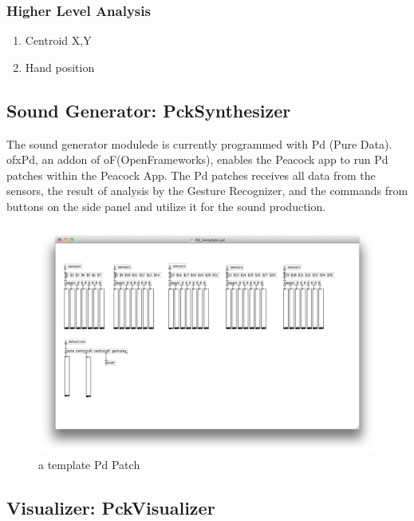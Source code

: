 \documentclass{nime-alternate}
\begin{document}
\subsubsection{Higher Level Analysis}

\begin{enumerate}
       \item Centroid X,Y
       \item Hand position
\end{enumerate}

\subsection{Sound Generator: PckSynthesizer}

The sound generator modulede is currently programmed with Pd (Pure Data)\cite{Pd}. ofxPd\cite{ofxPd}, an addon of oF(OpenFrameworks), enables the Peacock app to run Pd patches within the Peacock App. The Pd patches receives all data from the sensors, the result of analysis by the Gesture Recognizer, and the commands from buttons on the side panel and utilize it for the sound production.

\begin{figure}[htbp]
       \centering
              \includegraphics[width=1\columnwidth]{pd_patch}
       \caption{a template Pd Patch}
       \label{fig:modules}
\end{figure}
 
\subsection{Visualizer: PckVisualizer}
\end{document}

